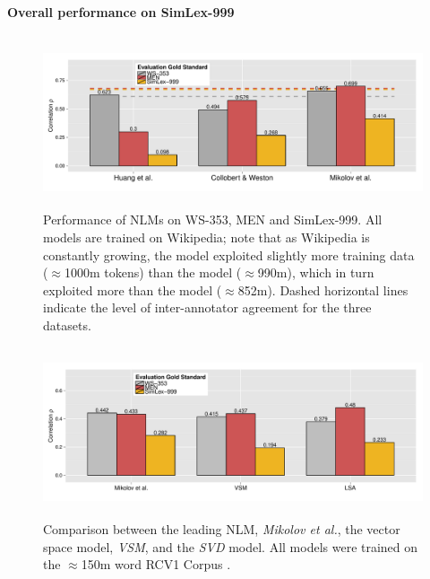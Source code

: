 \paragraph{\bf Overall performance on SimLex-999}

\begin{figure}[ht]  \includegraphics[width = \textwidth, height=5cm]{Chapter_3/Figure_2A_CL} \caption{Performance of NLMs on WS-353, MEN and SimLex-999. All models are trained on Wikipedia; note that as Wikipedia is constantly growing, the \protect\cite{mikolov2013efficient} model exploited slightly more training data ($\approx$1000m tokens) than the \protect\cite{huang2012improving} model ($\approx$990m), which in turn exploited more than the \protect\cite{collobert2008unified} model ($\approx$852m). Dashed horizontal lines indicate the level of inter-annotator agreement for the three datasets.}\end{figure}

\begin{figure}[ht]  \includegraphics[width = \textwidth,height=5cm]{Chapter_3/Figure_2B_CL}  \caption{Comparison between the leading NLM, \emph{Mikolov et al.}, the vector space model, \emph{VSM}, and the \emph{SVD} model. All models were trained on the $\approx$150m word RCV1 Corpus \protect\cite{lewis2004rcv1}.}\end{figure}

